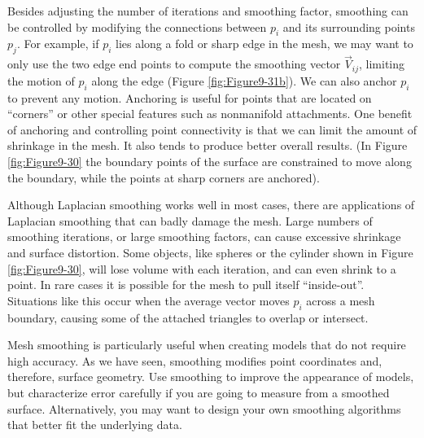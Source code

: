 \begin{figure}[!htb]
\end{figure}


Besides adjusting the number of iterations and smoothing factor, smoothing can be controlled by modifying the connections between $p_i$ and its surrounding points $p_j$. For example, if $p_i$ lies along a fold or sharp edge in the mesh, we may want to only use the two edge end points to compute the smoothing vector $\overrightarrow{V}_{ij}$, limiting the motion of $p_i$ along the edge (Figure \ref{fig:Figure9-31b}). We can also anchor $p_i$ to prevent any motion. Anchoring is useful for points that are located on ``corners'' or other special features such as nonmanifold attachments. One benefit of anchoring and controlling point connectivity is that we can limit the amount of shrinkage in the mesh. It also tends to produce better overall results. (In Figure \ref{fig:Figure9-30} the boundary points of the surface are constrained to move along the boundary, while the points at sharp corners are anchored).

Although Laplacian smoothing works well in most cases, there are applications of Laplacian smoothing that can badly damage the mesh. Large numbers of smoothing iterations, or large smoothing factors, can cause excessive shrinkage and surface distortion. Some objects, like spheres or the cylinder shown in Figure \ref{fig:Figure9-30}, will lose volume with each iteration, and can even shrink to a point. In rare cases it is possible for the mesh to pull itself ``inside-out''. Situations like this occur when the average vector moves $p_i$ across a mesh boundary, causing some of the attached triangles to overlap or intersect.

Mesh smoothing is particularly useful when creating models that do not require high accuracy. As we have seen, smoothing modifies point coordinates and, therefore, surface geometry. Use smoothing to improve the appearance of models, but characterize error carefully if you are going to measure from a smoothed surface. Alternatively, you may want to design your own smoothing algorithms that better fit the underlying data.

